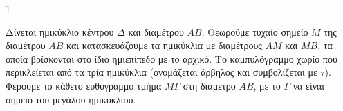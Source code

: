\begin{ylh}{1}
    \item [Γεωμετρία Β' Λυκείου, Εμβαδά]
\end{ylh}
\begin{figure}
\centering
\vspace{-2em} 
\end{figure}
Δίνεται ημικύκλιο κέντρου $\Delta$ και διαμέτρου $AB$. Θεωρούμε τυχαίο σημείο $M$ της διαμέτρου $AB$ και κατασκευάζουμε τα ημικύκλια με διαμέτρους $AM$ και $MB$, τα οποία βρίσκονται στο ίδιο ημιεπίπεδο με το αρχικό. Το καμπυλόγραμμο χωρίο που περικλείεται από τα τρία ημικύκλια (ονομάζεται άρβηλος και συμβολίζεται με $\tau$). Φέρουμε το κάθετο ευθύγραμμο τμήμα $M\Gamma$ στη διάμετρο $AB$, με το $\Gamma$ να είναι σημείο του μεγάλου ημικυκλίου.

